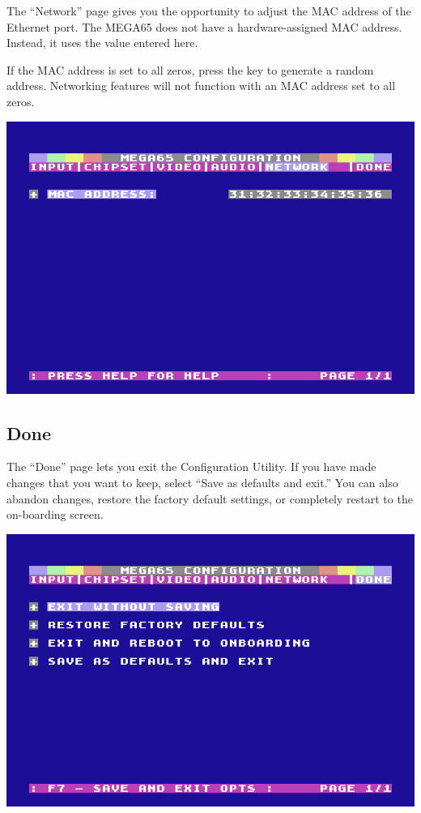 The ``Network'' page gives you the opportunity to adjust the MAC address of the Ethernet port. The MEGA65 does not have a hardware-assigned MAC address. Instead, it uses the value entered here.

If the MAC address is set to all zeros, press the  key to generate a random address. Networking features will not function with an MAC address set to all zeros.

\begin{center}
  \includegraphics[width=0.7\linewidth]{images/ss-m65config-5.png}
\end{center}

\subsection{Done}

The ``Done'' page lets you exit the Configuration Utility. If you have made changes that you want to keep, select ``Save as defaults and exit.'' You can also abandon changes, restore the factory default settings, or completely restart to the on-boarding screen.

\begin{center}
  \includegraphics[width=0.7\linewidth]{images/ss-m65config-save.png}
\end{center}



